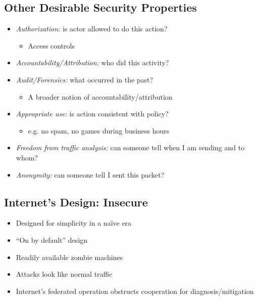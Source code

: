 \subsection{Other Desirable Security Properties}
\begin{itemize}[nosep]
    \item \emph{Authorization:} is actor allowed to do this action?
          \begin{itemize}[nosep]
              \item Access controls
          \end{itemize}
    \item \emph{Accountability/Attribution:} who did this activity?
    \item \emph{Audit/Forensics:} what occurred in the past?
          \begin{itemize}[nosep]
              \item A broader notion of accountability/attribution
          \end{itemize}
    \item \emph{Appropriate use:} is action consistent with policy?
          \begin{itemize}[nosep]
              \item e.g. no spam, no games during business hours
          \end{itemize}
    \item \emph{Freedom from traffic analysis:} can someone tell when I am sending and to whom?
    \item \emph{Anonymity:} can someone tell I sent this packet?
\end{itemize}

\subsection{Internet's Design: Insecure}
\begin{itemize}[nosep]
    \item Designed for simplicity in a na\"{i}ve era
    \item ``On by default'' design
    \item Readily available zombie machines
    \item Attacks look like normal traffic
    \item Internet's federated operation obstructs cooperation for diagnosis/mitigation
\end{itemize}

